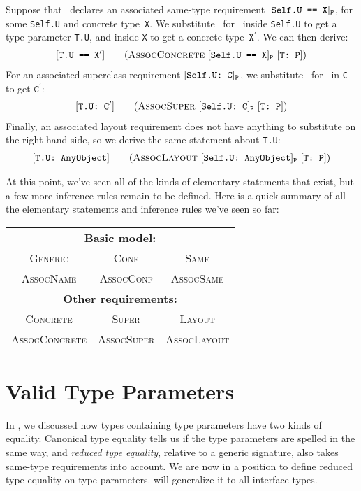 \documentclass[../generics]{subfiles}
\begin{document}
Suppose that \tP\ declares an associated same-type requirement $[\texttt{Self.U == X}]_{\texttt{P}}$, for some \texttt{Self.U} and concrete type~\texttt{X}. We substitute \tT\ for \tSelf\ inside \texttt{Self.U} to get a type parameter \texttt{T.U}, and inside \texttt{X} to get a concrete type~$\texttt{X}^\prime$. We can then derive:
\begin{gather*}
\AssocConcreteStepDef
\end{gather*}
For an associated superclass requirement $[\texttt{Self.U:~C}]_{\texttt{P}}$, we substitute \tT\ for \tSelf\ in \texttt{C} to get $\texttt{C}^\prime$:
\begin{gather*}
\AssocSuperStepDef
\end{gather*}
Finally, an associated layout requirement does not have anything to substitute on the right-hand side, so we derive the same statement about \texttt{T.U}:
\begin{gather*}
\AssocLayoutStepDef
\end{gather*}

\pagebreak

At this point, we've seen all of the kinds of elementary statements that exist, but a few more inference rules remain to be defined. Here is a quick summary of all the elementary statements and inference rules we've seen so far:
\begin{center}
\begin{tabular}{ccc}
\toprule
\multicolumn{3}{c}{\textbf{Basic model:}}\\
\textsc{Generic}&\textsc{Conf}&\textsc{Same}\\
\textsc{AssocName}&\textsc{AssocConf}&\textsc{AssocSame}\\
\midrule
\multicolumn{3}{c}{\textbf{Other requirements:}}\\
\textsc{Concrete}&\textsc{Super}&\textsc{Layout}\\
\textsc{AssocConcrete}&\textsc{AssocSuper}&\textsc{AssocLayout}\\
\bottomrule
\end{tabular}
\end{center}

\section{Valid Type Parameters}\label{type params}

In , we discussed how types containing type parameters have two kinds of equality. Canonical type equality tells us if the type parameters are spelled in the same way, and \emph{reduced type equality}, relative to a generic signature, also takes same-type requirements into account. We are now in a position to define reduced type equality on type parameters.  will generalize it to all interface types.
\end{document}

